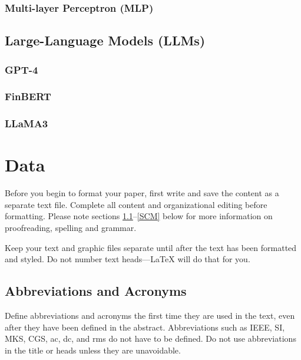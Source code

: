 \documentclass[conference]{IEEEtran}
\begin{document}
\subsubsection{Multi-layer Perceptron (MLP)}
\subsection{Large-Language Models (LLMs)}
\subsubsection{GPT-4}
\subsubsection{FinBERT}
\subsubsection{LLaMA3}
\section{Data}
Before you begin to format your paper, first write and save the content as a 
separate text file. Complete all content and organizational editing before 
formatting. Please note sections \ref{AA}--\ref{SCM} below for more information on 
proofreading, spelling and grammar.

Keep your text and graphic files separate until after the text has been 
formatted and styled. Do not number text heads---{\LaTeX} will do that 
for you.

\subsection{Abbreviations and Acronyms}\label{AA}
Define abbreviations and acronyms the first time they are used in the text, 
even after they have been defined in the abstract. Abbreviations such as 
IEEE, SI, MKS, CGS, ac, dc, and rms do not have to be defined. Do not use 
abbreviations in the title or heads unless they are unavoidable.
\end{document}
